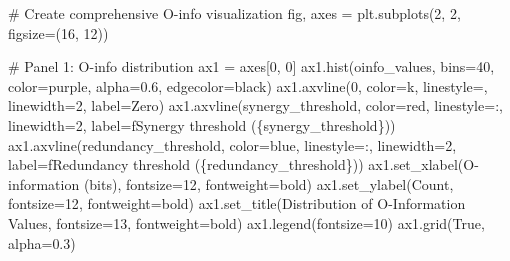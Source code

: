 \documentclass[
  11pt,
  letterpaper,
  oneside,
  openany]{book}
\newenvironment{Shaded}{\begin{snugshade}}{\end{snugshade}}
\newcommand{\CommentTok}[1]{\textcolor[rgb]{0.37,0.37,0.37}{#1}}
\newcommand{\DecValTok}[1]{\textcolor[rgb]{0.68,0.00,0.00}{#1}}
\newcommand{\FloatTok}[1]{\textcolor[rgb]{0.68,0.00,0.00}{#1}}
\newcommand{\NormalTok}[1]{\textcolor[rgb]{0.00,0.23,0.31}{#1}}
\newcommand{\OperatorTok}[1]{\textcolor[rgb]{0.37,0.37,0.37}{#1}}
\newcommand{\SpecialCharTok}[1]{\textcolor[rgb]{0.37,0.37,0.37}{#1}}
\newcommand{\SpecialStringTok}[1]{\textcolor[rgb]{0.13,0.47,0.30}{#1}}
\newcommand{\StringTok}[1]{\textcolor[rgb]{0.13,0.47,0.30}{#1}}
\newcommand{\VariableTok}[1]{\textcolor[rgb]{0.07,0.07,0.07}{#1}}
\begin{document}
\begin{Shaded}
\begin{Highlighting}[]
\CommentTok{\# Create comprehensive O{-}info visualization}
\NormalTok{fig, axes }\OperatorTok{=}\NormalTok{ plt.subplots(}\DecValTok{2}\NormalTok{, }\DecValTok{2}\NormalTok{, figsize}\OperatorTok{=}\NormalTok{(}\DecValTok{16}\NormalTok{, }\DecValTok{12}\NormalTok{))}

\CommentTok{\# Panel 1: O{-}info distribution}
\NormalTok{ax1 }\OperatorTok{=}\NormalTok{ axes[}\DecValTok{0}\NormalTok{, }\DecValTok{0}\NormalTok{]}
\NormalTok{ax1.hist(oinfo\_values, bins}\OperatorTok{=}\DecValTok{40}\NormalTok{, color}\OperatorTok{=}\StringTok{\textquotesingle{}purple\textquotesingle{}}\NormalTok{, alpha}\OperatorTok{=}\FloatTok{0.6}\NormalTok{, edgecolor}\OperatorTok{=}\StringTok{\textquotesingle{}black\textquotesingle{}}\NormalTok{)}
\NormalTok{ax1.axvline(}\DecValTok{0}\NormalTok{, color}\OperatorTok{=}\StringTok{\textquotesingle{}k\textquotesingle{}}\NormalTok{, linestyle}\OperatorTok{=}\StringTok{\textquotesingle{}{-}{-}\textquotesingle{}}\NormalTok{, linewidth}\OperatorTok{=}\DecValTok{2}\NormalTok{, label}\OperatorTok{=}\StringTok{\textquotesingle{}Zero\textquotesingle{}}\NormalTok{)}
\NormalTok{ax1.axvline(synergy\_threshold, color}\OperatorTok{=}\StringTok{\textquotesingle{}red\textquotesingle{}}\NormalTok{, linestyle}\OperatorTok{=}\StringTok{\textquotesingle{}:\textquotesingle{}}\NormalTok{, linewidth}\OperatorTok{=}\DecValTok{2}\NormalTok{,}
\NormalTok{           label}\OperatorTok{=}\SpecialStringTok{f\textquotesingle{}Synergy threshold (}\SpecialCharTok{\{}\NormalTok{synergy\_threshold}\SpecialCharTok{\}}\SpecialStringTok{)\textquotesingle{}}\NormalTok{)}
\NormalTok{ax1.axvline(redundancy\_threshold, color}\OperatorTok{=}\StringTok{\textquotesingle{}blue\textquotesingle{}}\NormalTok{, linestyle}\OperatorTok{=}\StringTok{\textquotesingle{}:\textquotesingle{}}\NormalTok{, linewidth}\OperatorTok{=}\DecValTok{2}\NormalTok{,}
\NormalTok{           label}\OperatorTok{=}\SpecialStringTok{f\textquotesingle{}Redundancy threshold (}\SpecialCharTok{\{}\NormalTok{redundancy\_threshold}\SpecialCharTok{\}}\SpecialStringTok{)\textquotesingle{}}\NormalTok{)}
\NormalTok{ax1.set\_xlabel(}\StringTok{\textquotesingle{}O{-}information (bits)\textquotesingle{}}\NormalTok{, fontsize}\OperatorTok{=}\DecValTok{12}\NormalTok{, fontweight}\OperatorTok{=}\StringTok{\textquotesingle{}bold\textquotesingle{}}\NormalTok{)}
\NormalTok{ax1.set\_ylabel(}\StringTok{\textquotesingle{}Count\textquotesingle{}}\NormalTok{, fontsize}\OperatorTok{=}\DecValTok{12}\NormalTok{, fontweight}\OperatorTok{=}\StringTok{\textquotesingle{}bold\textquotesingle{}}\NormalTok{)}
\NormalTok{ax1.set\_title(}\StringTok{\textquotesingle{}Distribution of O{-}Information Values\textquotesingle{}}\NormalTok{, fontsize}\OperatorTok{=}\DecValTok{13}\NormalTok{, fontweight}\OperatorTok{=}\StringTok{\textquotesingle{}bold\textquotesingle{}}\NormalTok{)}
\NormalTok{ax1.legend(fontsize}\OperatorTok{=}\DecValTok{10}\NormalTok{)}
\NormalTok{ax1.grid(}\VariableTok{True}\NormalTok{, alpha}\OperatorTok{=}\FloatTok{0.3}\NormalTok{)}


\end{Highlighting}
\end{Shaded}
\end{document}
